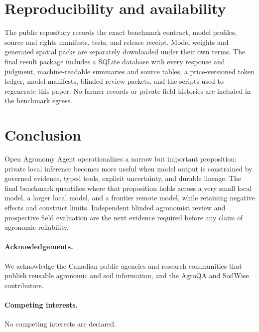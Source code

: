 \documentclass[9pt,twocolumn]{article}
\newcommand{\system}{Open Agronomy Agent}
\begin{document}
\section{Reproducibility and availability}

The public repository records the exact benchmark contract, model profiles, source and rights manifests, tests, and release receipt. Model weights and generated spatial packs are separately downloaded under their own terms. The final result package includes a SQLite database with every response and judgment, machine-readable summaries and source tables, a price-versioned token ledger, model manifests, blinded review packets, and the scripts used to regenerate this paper. No farmer records or private field histories are included in the benchmark egress.

\section{Conclusion}

\system{} operationalizes a narrow but important proposition: private local inference becomes more useful when model output is constrained by governed evidence, typed tools, explicit uncertainty, and durable lineage. The final benchmark quantifies where that proposition holds across a very small local model, a larger local model, and a frontier remote model, while retaining negative effects and construct limits. Independent blinded agronomist review and prospective field evaluation are the next evidence required before any claim of agronomic reliability.

\paragraph{Acknowledgements.} We acknowledge the Canadian public agencies and research communities that publish reusable agronomic and soil information, and the AgroQA and SoilWise contributors.

\paragraph{Competing interests.} No competing interests are declared.


{\footnotesize}
\end{document}
